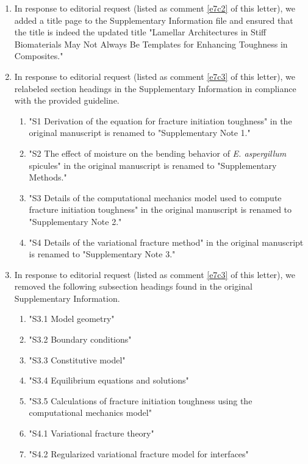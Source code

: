 \documentclass[11pt,letterpaper]{report}
\begin{document}
\begin{enumerate}[label=\textit{Ec.\arabic*}]
\item \label{Supplementary2} In response to editorial request (listed as comment \ref{e7c2} of this letter), we added a title page to the Supplementary Information file and ensured that the title is indeed the updated title "Lamellar Architectures in Stiff Biomaterials May Not Always Be Templates for Enhancing Toughness in Composites."

\item \label{Supplementary3} In response to editorial request (listed as comment \ref{e7c3} of this letter), we relabeled section headings in the Supplementary Information in compliance with the provided guideline.
\begin{enumerate}[label=\textit{\ref{Supplementary3}.\roman*}]

    \item "S1 Derivation of the equation for fracture initiation toughness" in the original manuscript is renamed to "Supplementary Note 1."
     \item "S2 The effect of moisture on the bending behavior of \textit{E. aspergillum} spicules" in the original manuscript is renamed to "Supplementary Methods."
    \item "S3 Details of the computational mechanics model used to compute fracture initiation toughness" in the original manuscript is renamed to "Supplementary Note 2."
    \item "S4 Details of the variational fracture method" in the original manuscript is renamed to "Supplementary Note 3."


\end{enumerate}
\item \label{Supplementary4} In response to editorial request (listed as comment \ref{e7c3} of this letter), we removed the following subsection headings found in the original Supplementary Information.
\begin{enumerate}[label=\textit{\ref{Supplementary4}.\roman*}]

    \item "S3.1 Model geometry"
    \item "S3.2 Boundary conditions"
    \item "S3.3 Constitutive model"
    \item "S3.4 Equilibrium equations and solutions"
    \item "S3.5 Calculations of fracture initiation toughness using the computational mechanics model"
    \item "S4.1 Variational fracture theory"
    \item "S4.2 Regularized variational fracture model for interfaces"


\end{enumerate}
\end{enumerate}
\end{document}
